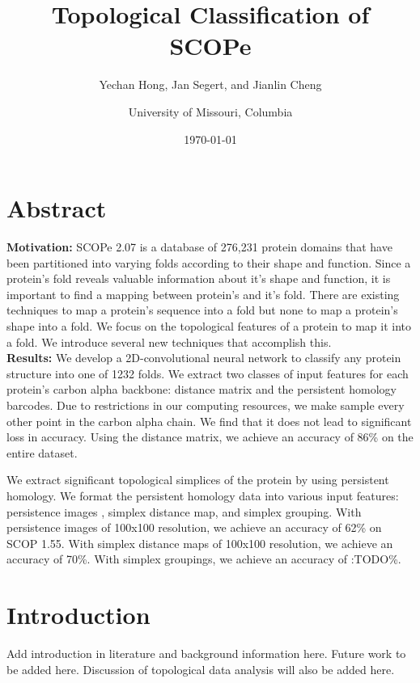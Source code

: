 \documentclass[12pt, a4paper, twocolumn, fullpage]{article}
\title{Topological Classification of SCOPe}
\author{Yechan Hong, Jan Segert, and Jianlin Cheng
\and University of Missouri, Columbia}
\date{\today}
\theoremstyle{plain}
\theoremstyle{definition}
\theoremstyle{remark}
\begin{document}
\maketitle

\section*{Abstract}

\textbf{Motivation:} SCOPe 2.07 is a database of 276,231 protein domains that have been partitioned into varying folds according to their shape and function. Since a protein's fold reveals valuable information about it's shape and function, it is important to find a mapping between protein's and it's fold. There are existing techniques to map a protein's sequence into a fold \cite{deepsf} but none to map a protein's shape into a fold. We focus on the topological features of a protein to map it into a fold. We introduce several new techniques that accomplish this.
\\
\textbf{Results:} We develop a 2D-convolutional neural network to classify any protein structure into one of 1232 folds. 
We extract two classes of input features for each protein's carbon alpha backbone: distance matrix and the persistent homology barcodes. Due to restrictions in our computing resources, we make sample every other point in the carbon alpha chain. We find that it does not lead to significant loss in accuracy.
Using the distance matrix, we achieve an accuracy of 86\% on the entire dataset.

We extract significant topological simplices of the protein by using persistent homology. We format the persistent homology data into various input features: persistence images \cite{persistenceImages}, simplex distance map, and simplex grouping.  With persistence images of 100x100 resolution, we achieve an accuracy of 62\% on SCOP 1.55. With simplex distance maps of 100x100 resolution, we achieve an accuracy of 70\%. With simplex groupings, we achieve an accuracy of :TODO\%.
    

\section{Introduction}
    Add introduction in literature and background information here. Future work to be added here. Discussion of topological data analysis will also be added here.
\end{document}
